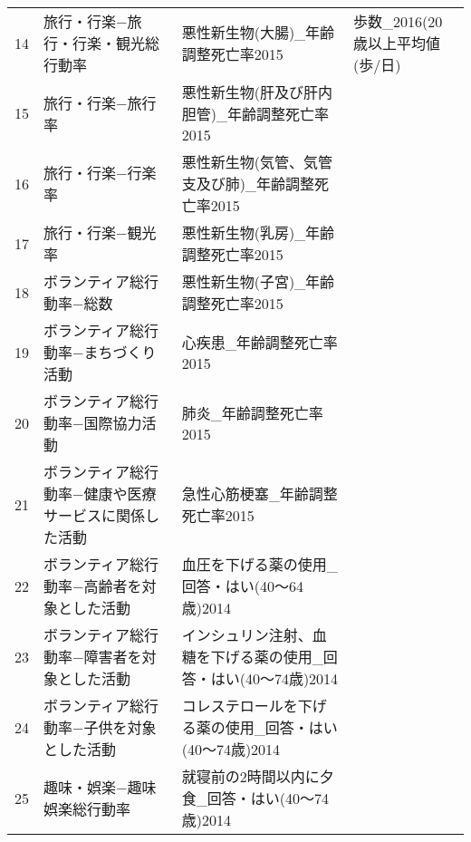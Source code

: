 \begin{table}[ht]
\begin{adjustbox}{width=.5\textwidth}
\begin{tabular}{rlll}
  14 & 旅行・行楽−旅行・行楽・観光総行動率 & 悪性新生物(大腸)\_年齢調整死亡率2015 & 歩数\_2016(20歳以上平均値(歩/日) \\
  15 & 旅行・行楽−旅行率 & 悪性新生物(肝及び肝内胆管)\_年齢調整死亡率2015 &  \\
  16 & 旅行・行楽−行楽率 & 悪性新生物(気管、気管支及び肺)\_年齢調整死亡率2015 &  \\
  17 & 旅行・行楽−観光率 & 悪性新生物(乳房)\_年齢調整死亡率2015 &  \\
  18 & ボランティア総行動率−総数 & 悪性新生物(子宮)\_年齢調整死亡率2015 &  \\
  19 & ボランティア総行動率−まちづくり活動 & 心疾患\_年齢調整死亡率2015 &  \\
  20 & ボランティア総行動率−国際協力活動 & 肺炎\_年齢調整死亡率2015 &  \\
  21 & ボランティア総行動率−健康や医療サービスに関係した活動 & 急性心筋梗塞\_年齢調整死亡率2015 &  \\
  22 & ボランティア総行動率−高齢者を対象とした活動 & 血圧を下げる薬の使用\_回答・はい(40〜64歳)2014 &  \\
  23 & ボランティア総行動率−障害者を対象とした活動 & インシュリン注射、血糖を下げる薬の使用\_回答・はい(40〜74歳)2014 &  \\
  24 & ボランティア総行動率−子供を対象とした活動 & コレステロールを下げる薬の使用\_回答・はい(40〜74歳)2014 &  \\
  25 & 趣味・娯楽−趣味娯楽総行動率 & 就寝前の2時間以内に夕食\_回答・はい(40〜74歳)2014 &  \\
   \hline
\end{tabular}
\end{adjustbox}

\endgroup
\end{table}
